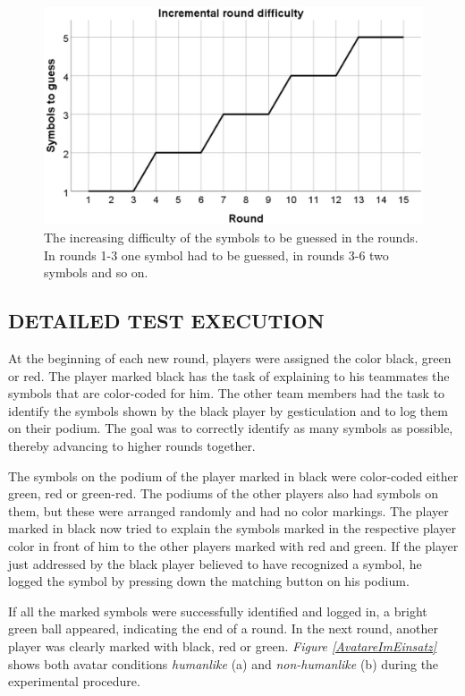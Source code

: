 \documentclass[sigchi]{acmart}
\begin{document}
\begin{figure}[H]
		\begin{footnotesize}
		\centering
			\includegraphics[width=0.9\linewidth]{Abbildungen/RoundDifficulty.JPG}	
			\caption[The difficulty of the rounds]{The increasing difficulty of the symbols to be guessed in the rounds. In rounds 1-3 one symbol had to be guessed, in rounds 3-6 two symbols and so on.}
			\label{RoundDifficulty}
		\end{footnotesize}
	\end{figure}

\subsection{DETAILED TEST EXECUTION}
At the beginning of each new round, players were assigned the color black, green or red.
The player marked black has the task of explaining to his teammates the symbols that are color-coded for him. The other team members had the task to identify the symbols shown by the black player by gesticulation and to log them on their podium. The goal was to correctly identify as many symbols as possible, thereby advancing to higher rounds together.

The symbols on the podium of the player marked in black were color-coded either green, red or green-red. The podiums of the other players also had symbols on them, but these were arranged randomly and had no color markings. The player marked in black now tried to explain the symbols marked in the respective player color in front of him to the other players marked with red and green. If the player just addressed by the black player believed to have recognized a symbol, he logged the symbol by pressing down the matching button on his podium. 

If all the marked symbols were successfully identified and logged in, a bright green ball appeared, indicating the end of a round.
In the next round, another player was clearly marked with black, red or green.
\textit{Figure \ref{AvatareImEinsatz}} shows both avatar conditions \textit{humanlike} (a) and \textit{non-humanlike} (b) during the experimental procedure.
	
\end{document}
